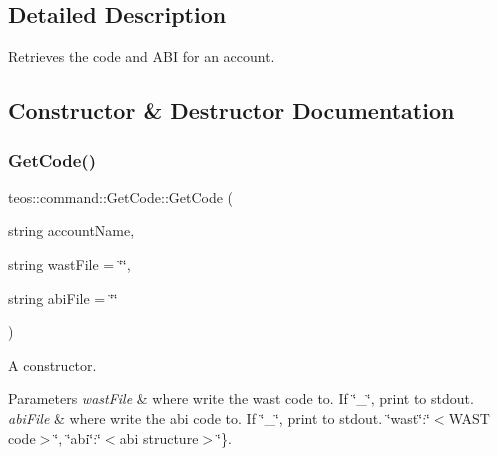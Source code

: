 \subsection{Detailed Description}
Retrieves the code and A\+BI for an account. 

\subsection{Constructor \& Destructor Documentation}
\mbox{\label{classteos_1_1command_1_1_get_code_ac1111aac4926fccc9447c1009aadf299}} 
\subsubsection{\texorpdfstring{Get\+Code()}{GetCode()}\hspace{0.1cm}{\footnotesize\ttfamily [1/2]}}
{\footnotesize\ttfamily teos\+::command\+::\+Get\+Code\+::\+Get\+Code (\begin{DoxyParamCaption}\item[{string}]{account\+Name,  }\item[{string}]{wast\+File = {\ttfamily \char`\"{}\char`\"{}},  }\item[{string}]{abi\+File = {\ttfamily \char`\"{}\char`\"{}} }\end{DoxyParamCaption})\hspace{0.3cm}{\ttfamily [inline]}}



A constructor. 


\begin{DoxyParams}{Parameters}
{\em wast\+File} & where write the wast code to. If \char`\"{}\+\_\+\char`\"{}, print to stdout. \\
\hline
{\em abi\+File} & where write the abi code to. If \char`\"{}\+\_\+\char`\"{}, print to stdout. \char`\"{}wast\char`\"{}\+:\char`\"{}$<$\+W\+A\+S\+T code$>$\char`\"{}, \char`\"{}abi\char`\"{}\+:\char`\"{}$<$abi structure$>$\char`\"{}\}. \\
\hline
\end{DoxyParams}
\mbox{\label{classteos_1_1command_1_1_get_code_aa93979c1ca9b4296ccfc4ea847bd2217}} 
